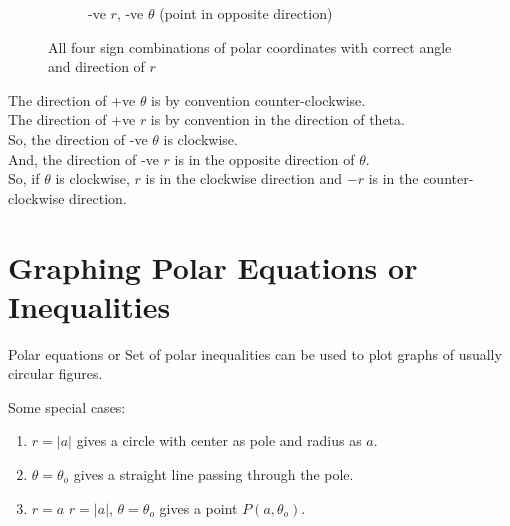 \begin{figure}[H]
  \begin{subfigure}[b]{0.45\textwidth}
    \centering
    \caption{-ve $r$, -ve $\theta$ (point in opposite direction)}
  \end{subfigure}

  \caption{All four sign combinations of polar coordinates with correct angle and direction of $r$}
  \label{fig:polar-corrected}
\end{figure}

The direction of +ve \( \theta \) is by convention counter-clockwise.\\
The direction of +ve \( r \) is by convention in the direction of theta.\\
So, the direction of -ve \( \theta \) is clockwise.\\
And, the direction of -ve \( r \) is in the opposite direction of \( \theta \).\\
So, if \( \theta \) is clockwise, \( r \) is in the clockwise direction and \( -r \) is in the counter-clockwise direction.\\

\section{Graphing Polar Equations or Inequalities}
\label{sec:graph-polar-equat-ineq}
Polar equations or Set of polar inequalities can be used to plot graphs of
usually circular figures.
\begin{note}
  Some special cases:\\
  \begin{enumerate}
    \item \(r=\left| a \right| \) gives a circle with center as pole and radius as \( a \).
    \item \( \theta=\theta_o \) gives a straight line passing through the pole.
    \item \sout{\( r=a\)} \(r=\left| a \right| \), \(\theta=\theta_o \) gives a
      point \( P(a,\theta_o) \).
  \end{enumerate}
\end{note}

